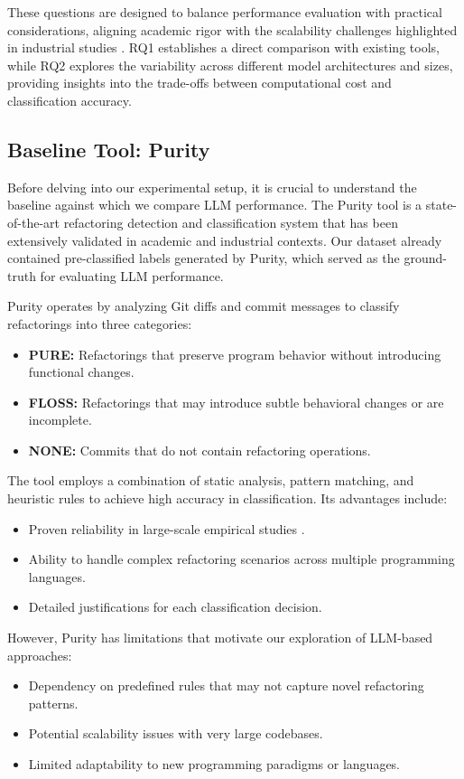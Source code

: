 These questions are designed to balance performance evaluation with practical considerations, aligning academic rigor with the scalability challenges highlighted in industrial studies \cite{ivers2022industry,kim2014microsoft}. RQ1 establishes a direct comparison with existing tools, while RQ2 explores the variability across different model architectures and sizes, providing insights into the trade-offs between computational cost and classification accuracy.

\subsection{Baseline Tool: Purity}

Before delving into our experimental setup, it is crucial to understand the baseline against which we compare LLM performance. The Purity tool \cite{mongiovi2018detecting} is a state-of-the-art refactoring detection and classification system that has been extensively validated in academic and industrial contexts. Our dataset already contained pre-classified labels generated by Purity, which served as the ground-truth for evaluating LLM performance.

Purity operates by analyzing Git diffs and commit messages to classify refactorings into three categories:
\begin{itemize}
    \item \textbf{PURE:} Refactorings that preserve program behavior without introducing functional changes.
    \item \textbf{FLOSS:} Refactorings that may introduce subtle behavioral changes or are incomplete.
    \item \textbf{NONE:} Commits that do not contain refactoring operations.
\end{itemize}

The tool employs a combination of static analysis, pattern matching, and heuristic rules to achieve high accuracy in classification. Its advantages include:
\begin{itemize}
    \item Proven reliability in large-scale empirical studies \cite{mongiovi2015scaling}.
    \item Ability to handle complex refactoring scenarios across multiple programming languages.
    \item Detailed justifications for each classification decision.
\end{itemize}

However, Purity has limitations that motivate our exploration of LLM-based approaches:
\begin{itemize}
    \item Dependency on predefined rules that may not capture novel refactoring patterns.
    \item Potential scalability issues with very large codebases.
    \item Limited adaptability to new programming paradigms or languages.
\end{itemize}

